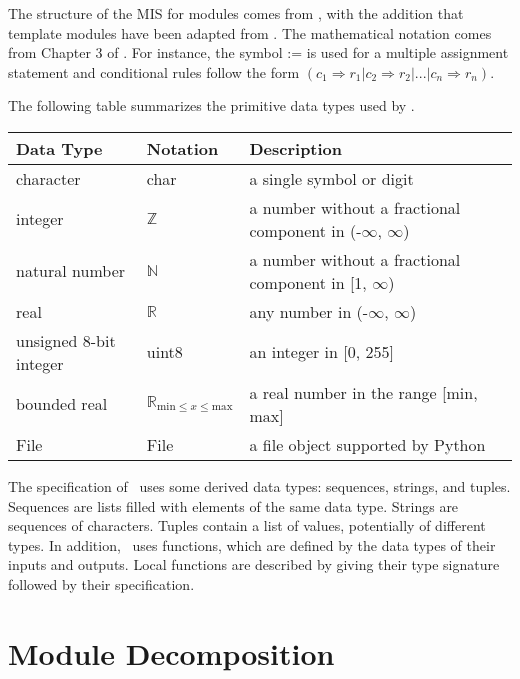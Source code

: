 \documentclass[12pt, titlepage]{article}
\begin{document}

The structure of the MIS for modules comes from \citet{HoffmanAndStrooper1995},
with the addition that template modules have been adapted from
\cite{GhezziEtAl2003}.  The mathematical notation comes from Chapter 3 of
\citet{HoffmanAndStrooper1995}.  For instance, the symbol := is used for a
multiple assignment statement and conditional rules follow the form $(c_1
\Rightarrow r_1 | c_2 \Rightarrow r_2 | ... | c_n \Rightarrow r_n )$.

The following table summarizes the primitive data types used by \progname. 

\begin{center}
\renewcommand{\arraystretch}{1.2}
\noindent 
\begin{tabular}{l l p{7.5cm}} 
\toprule 
\textbf{Data Type} & \textbf{Notation} & \textbf{Description}\\ 
\midrule
character & char & a single symbol or digit\\
integer & $\mathbb{Z}$ & a number without a fractional component in (-$\infty$, $\infty$) \\
natural number & $\mathbb{N}$ & a number without a fractional component in [1, $\infty$) \\
real & $\mathbb{R}$ & any number in (-$\infty$, $\infty$)\\
unsigned 8-bit integer & uint8 & an integer in [0, 255]\\
bounded real & $\mathbb{R}_{\text{min} \leq x \leq \text{max}}$ & a real number in the range [$\text{min}$, $\text{max}$]\\
File & File & a file object supported by Python\\
\bottomrule
\end{tabular} 
\end{center}

\noindent
The specification of \progname \ uses some derived data types: sequences, strings, and
tuples. Sequences are lists filled with elements of the same data type. Strings
are sequences of characters. Tuples contain a list of values, potentially of
different types. In addition, \progname \ uses functions, which
are defined by the data types of their inputs and outputs. Local functions are
described by giving their type signature followed by their specification.

\section{Module Decomposition}
\end{document}
